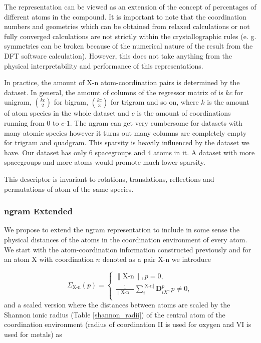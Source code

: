 \documentclass[11pt,oneside,czech,american]{book} %
\theoremstyle{plain}
\theoremstyle{definition}
\begin{document}
The representation can be viewed as an extension of the concept of percentages of different atoms in the compound.
It is important to note that the coordination numbers and geometries which can be obtained from relaxed calculations or not fully converged calculations are not strictly within the crystallographic rules (e. g. symmetries can be broken because of the numerical nature of the result from the DFT software calculation). However, this does not take anything from the physical interpretability and performance of this representations.

In practice, the amount of X-n atom-coordination pairs is determined by the dataset. In general, the amount of columns of the regressor matrix of is $kc$ for unigram, $\binom{kc}{2}$ for bigram, $\binom{kc}{3}$ for trigram and so on, where $k$ is the amount of atom species in the whole dataset and $c$ is the amount of coordinations running from 0 to $c$-$1$. The ngram can get very cumbersome for datasets with many atomic species however it turns out many columns are completely empty for trigram and quadgram. This sparsity is heavily influenced by the dataset we have. Our dataset has only 6 spacegroups and 4 atoms in it. A dataset with more spacegroups and more atoms would promote much lower sparsity.

This descriptor is invariant to rotations, translations, reflections and permutations of atom of the same species. 

\subsubsection{ngram Extended}
We propose to extend the ngram representation to include in some sense the physical distances of the atoms in the coordination environment of every atom. We start with the atom-coordination information constructed previously and for an atom X with coordination $n$ denoted as a pair X-n we introduce

\begin{equation}
	\Sigma_{\text{X-n}}(p) =
	\begin{cases}
		\|\text{X-n}\|, p=0, \\
		\frac{1}{\|\text{X-n}\|}\sum_{i}^{|\text{X-n}|} \bm{D}_{iX}^p, p \neq 0, \\
		
	\end{cases}
\label{proposed}
\end{equation}
and a scaled version where the distances between atoms are scaled by the Shannon ionic radius (Table \ref{shannon_radii}) of the central atom of the coordination environment (radius of coordination II is used for oxygen and VI is used for metals) as
\end{document}
